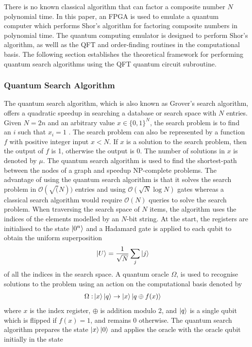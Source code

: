There is no known classical algorithm that can factor a composite number $N$ polynomial time. In this paper, an FPGA is used to emulate a quantum computer which performs Shor's algorithm for factoring composite numbers in polynomial time. The quantum computing emulator is designed to perform Shor's algorithm, as welll as the QFT and order-finding routines in the computational basis. The following section establishes the theoretical framework for performing quantum search algorithms using the QFT quantum circuit subroutine.

\subsubsection{Quantum Search Algorithm \label{subsubsec:q-search-algo}}

The quantum search algorithm, which is also known as Grover's search algorithm, offers a quadratic speedup in searching a database or search space with $N$ entries. Given $N = 2n$ and an arbitrary value $x \in \{0, 1\}^N$, the search problem is to find an $i$ such that $x_i = 1$ \cite{DeWolf2019}. The search problem can also be represented by a function $f$ with positive integer input $x < N$. If $x$ is a solution to the search problem, then the output of $f$ is 1, otherwise the output is 0. The number of solutions in $x$ is denoted by $\mu$. The quantum search algorithm is used to find the shortest-path between the nodes of a graph and speedup \gls{NP-complete} problems. The advantage of using the quantum search algorithm is that it solves the search problem in $\mathcal{O}(\sqrt(N))$ entries and using $\mathcal{O}(\sqrt{N}\log N)$ gates whereas a classical search algorithm would require $\mathcal{O}(N)$ queries to solve the search problem. When traversing the search space of $N$ items, the algorithm uses the indices of the elements modelled by an $N$-bit string. At the start, the registers are initialised to the state $\ket{0^n}$ and a Hadamard gate is applied to each qubit to obtain the uniform superposition
\begin{align}
	\ket{U} & = \frac{1}{\sqrt{N}}\sum_{j}\ket{j}
\end{align}
of all the indices in the search space. A quantum oracle $\Omega$, is used to recognise solutions to the problem using an action on the computational basis denoted by
\begin{align}\label{eqn:grovers-oracle}
	\Omega: & \ket{x}\ket{q} \rightarrow \ket{x}\ket{q\oplus f(x)}
\end{align}
where $x$ is the index register, $\oplus$ is addition modulo 2, and $\ket{q}$ is a single qubit which is flipped if $f(x) = 1$, and remains 0 otherwise. The quantum search algorithm prepares the state $\ket{x}\ket{0}$ and applies the oracle with the oracle qubit initially in the state 
